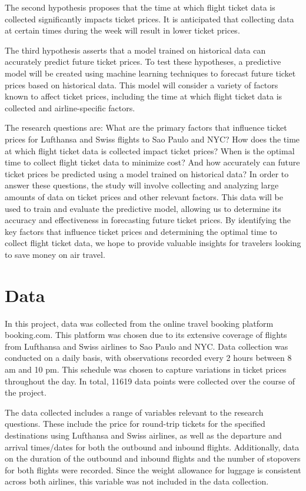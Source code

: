 The second hypothesis proposes that the time at which flight ticket data is collected significantly impacts ticket prices.
It is anticipated that collecting data at certain times during the week will result in lower ticket prices.

The third hypothesis asserts that a model trained on historical data can accurately predict future ticket prices. 
To test these hypotheses, a predictive model will be created using machine learning techniques to forecast future ticket prices based on historical data.
This model will consider a variety of factors known to affect ticket prices, including the time at which flight ticket data is collected and airline-specific factors.

The research questions are: What are the primary factors that influence ticket prices for Lufthansa and Swiss flights to Sao Paulo and NYC? How does the time at which flight ticket data is collected impact ticket prices? When is the optimal time to collect flight ticket data to minimize cost? And how accurately can future ticket prices be predicted using a model trained on historical data?
In order to answer these questions, the study will involve collecting and analyzing large amounts of data on ticket prices and other relevant factors. This data will be used to train and evaluate the predictive model, allowing us to determine its accuracy and effectiveness in forecasting future ticket prices. By identifying the key factors that influence ticket prices and determining the optimal time to collect flight ticket data, we hope to provide valuable insights for travelers looking to save money on air travel.


\section{Data}
\label{chap:data}
In this project, data was collected from the online travel booking platform booking.com.
This platform was chosen due to its extensive coverage of flights from Lufthansa and Swiss airlines to Sao Paulo and NYC.
Data collection was conducted on a daily basis, with observations recorded every 2 hours between 8 am and 10 pm.
This schedule was chosen to capture variations in ticket prices throughout the day.
In total, 11619 data points were collected over the course of the project.

The data collected includes a range of variables relevant to the research questions.
These include the price for round-trip tickets for the specified destinations using Lufthansa and Swiss airlines,
as well as the departure and arrival times/dates for both the outbound and inbound flights.
Additionally, data on the duration of the outbound and inbound flights and the number of stopovers for both flights were recorded.
Since the weight allowance for luggage is consistent across both airlines, this variable was not included in the data collection.

